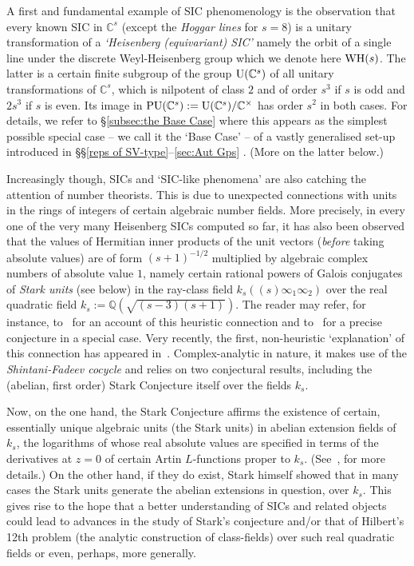 \documentclass[12pt]{article}
\newcounter{example}[section]
\newcommand{\bbC}{\ensuremath{\mathbb{C}}}\newcommand{\bbCp}{\ensuremath{\mathbb{C}_p}}
\newcommand{\bbQ}{\ensuremath{\mathbb{Q}}}
\newcommand{\U}{{\rm U}}
\begin{document}
A first and fundamental example of SIC phenomenology is the observation that every known SIC in $\bbC^s$ (except the \textit{Hoggar lines} for $s=8$) is a unitary transformation of a  \textit{`Heisenberg (equivariant) SIC'} namely the orbit of a single line under the discrete Weyl-Heisenberg group which we denote here ${\rm WH}(s)$. The latter is a certain finite subgroup of the group $\U(\bbC^s)$ of all unitary transformations of $\bbC^s$, which is nilpotent of class $2$ and of order $s^3$ if $s$ is odd and $2s^3$ if $s$ is even. Its image in ${\rm PU}(\bbC^s):={\rm U}(\bbC^s)/\bbC^\times$ has order $s^2$ in both cases. For details, we refer to \S\ref{subsec:the Base Case} where this appears as the simplest possible special case -- we call it the `Base Case' -- of a vastly generalised set-up introduced in \S\S\ref{reps of SV-type}--\ref{sec:Aut Gps}  . (More on the latter below.)

Increasingly though,  SICs and `SIC-like phenomena' are also catching the attention of number theorists. This is due to unexpected connections with units in the rings of integers of certain algebraic number fields. More precisely, in every one of the very many Heisenberg SICs computed so far, it has also been observed that the values of Hermitian inner products of the unit vectors (\textit{before} taking absolute values) are of form $(s+1)^{-1/2}$ multiplied 
by algebraic complex numbers of absolute value $1$, namely certain rational powers of Galois conjugates of \textit{Stark units} (see below) in the ray-class field $k_s((s)\infty_1\infty_2)$ over the real quadratic field $k_s:=\bbQ(\sqrt{(s-3)(s+1)})$. The reader may refer, for instance, to~\cite{ABGHM} for an account of this heuristic connection and to~\cite{Kopp IMRN} for a precise conjecture in a special case. 
Very recently, the first, non-heuristic `explanation' of this connection has appeared in~\cite{AFK constructive}. Complex-analytic in nature, it makes use of the \textit{Shintani-Fadeev cocycle} and relies on two conjectural results, including the (abelian, first order) Stark Conjecture itself over the fields $k_s$. 

Now, on the one hand, the Stark Conjecture affirms the existence of certain, essentially unique algebraic units (the Stark units) in abelian extension fields of $k_s$, the logarithms of whose real absolute values are specified in terms of the derivatives at $z=0$ of certain Artin $L$-functions proper to $k_s$. (See~\cite{Stark}, \cite{Tate} for more details.) 
On the other hand, if they do exist, Stark himself showed that in many cases the Stark units generate the abelian extensions in question, over $k_s$. This gives rise to the hope that a better understanding of SICs and related objects could lead to advances in the study of Stark's conjecture and/or that of Hilbert's 12th problem (the analytic construction of class-fields) over such real quadratic fields or even, perhaps, more generally.
\end{document}
